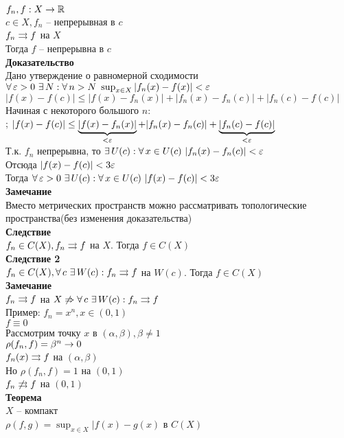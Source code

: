 \documentclass[12pt]{article}
\begin{document}
$f_n, f: X \rto \Rset$\\
$c \in X, f_n$ -- непрерывная в $c$\\
$f_n \rrto f$ на $X$\\
Тогда $f$ -- непрерывна в $c$\\
\textbf{Доказательство}\\
Дано утверждение о равномерной сходимости\\
$\fall \eps > 0\ \ex N: \fall n > N\ \sup_{x\in X} |f_n(x) - f(x)|<\eps$\\
$|f(x)-f(c)| \leq |f(x)-f_n(x)| + |f_n(x)-f_n(c)| + |f_n(c)-f(c)|$\\
Начиная с некоторого большого $n:$\\;
$|f(x)-f(c)| \leq \ub{< \eps}{|f(x)-f_n(x)|} + |f_n(x)-f_n(c)| + \ub{< \eps}{|f_n(c)-f(c)|}$\\
Т.к. $f_n$ непрерывна, то $\ex U(c): \fall x \in U(c)\ |f_n(x)-f_n(c)| < \eps$\\
Отсюда $|f(x)-f(c)| < 3\eps$\\
Тогда $\fall \eps > 0\ \ex U(c): \fall x \in U(c)\ |f(x)-f(c)| < 3\eps$\\
\textbf{Замечание}\\
Вместо метрических пространств можно рассматривать топологические пространства(без изменения доказательства)\\
\textbf{Следствие}\\
$f_n \in C(X), f_n \rrto f$ на $X$. Тогда $f \in C(X)$\\
\textbf{Следствие 2}\\
$f_n \in C(X), \fall c\ \ex W(c): f_n \rrto f$ на $W(c)$. Тогда $f \in C(X)$\\
\textbf{Замечание}\\
$f_n \rrto f$ на $X \not \Rto \fall c\ \ex W(c): f_n \rrto f$\\
Пример: $f_n = x^n, x \in (0,1)$\\
$f \equiv 0$\\
Рассмотрим точку $x$ в $(\alpha, \beta), \beta \neq 1$\\
$\rho(f_n, f) = \beta^n \rto 0$\\
$f_n(x) \rrto f$ на $(\alpha, \beta)$\\
Но $\rho(f_n, f) = 1$ на $(0,1)$\\
$f_n \not\rrto f$ на $(0,1)$\\
\textbf{Теорема}\\
$X$ -- компакт\\
$\rho(f,g) = \sup_{x\in X}|f(x)-g(x)$ в $C(X)$\\
\end{document}
